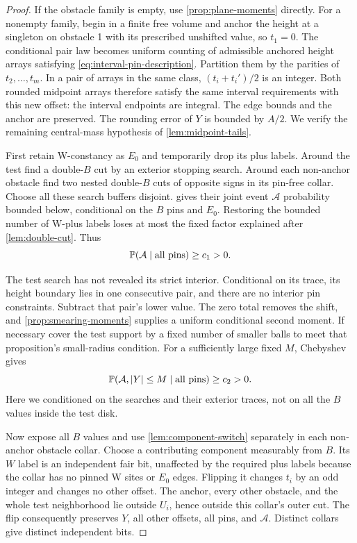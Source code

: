 \begin{proof}
If the obstacle family is empty, use \cref{prop:plane-moments} directly.
For a nonempty family, begin in a finite free volume and anchor the
height at a singleton on obstacle 1 with its prescribed unshifted
value, so $t_1=0$.  The conditional
pair law becomes uniform counting of admissible anchored height arrays
satisfying \eqref{eq:interval-pin-description}.  Partition them by the
parities of $t_2,\ldots,t_m$.  In a pair of arrays in the same class,
$(t_i+t_i')/2$ is an integer.  Both rounded midpoint arrays therefore
satisfy the same interval requirements with this new offset: the interval
endpoints are integral.  The edge bounds and the anchor are preserved.
The rounding error of $Y$ is bounded by $A/2$.  We verify the remaining
central-mass hypothesis of \cref{lem:midpoint-tails}.

First retain W-constancy as $E_0$ and temporarily drop its plus labels.
Around the test find a double-$B$ cut by an exterior stopping search.
Around each non-anchor obstacle find two nested double-$B$ cuts of
opposite signs in its pin-free collar.  Choose all these search buffers
disjoint.   gives their joint event $\mathcal A$
probability bounded below, conditional on the $B$ pins and $E_0$.
Restoring the bounded number of W-plus labels loses at most the fixed
factor explained after \cref{lem:double-cut}.  Thus
\begin{equation}\label{eq:obstacle-cut-probability}
 \mathbb P(\mathcal A\mid\hbox{all pins})\geq c_1>0.
\end{equation}

The test search has not revealed its strict interior.  Conditional on
its trace, its height boundary lies in one consecutive pair, and there
are no interior pin constraints.  Subtract that pair's lower value.
The zero total removes the shift, and \cref{prop:smearing-moments} supplies
a uniform conditional second moment.  If necessary cover the test support
by a fixed number of smaller balls to meet that proposition's small-radius
condition.  For a sufficiently large fixed $M$, Chebyshev gives
\begin{equation}\label{eq:obstacle-central-event}
 \mathbb P(\mathcal A,\lvert Y\rvert\leq M\mid\hbox{all pins})\geq c_2>0.
\end{equation}
Here we conditioned on the searches and their exterior traces, not on
all the $B$ values inside the test disk.

Now expose all $B$ values and use \cref{lem:component-switch} separately
in each non-anchor obstacle collar.  Choose a contributing component
measurably from $B$.  Its $W$ label is an independent fair bit, unaffected
by the required plus labels because the collar has no pinned W sites or
$E_0$ edges.  Flipping it changes $t_i$ by an odd integer and changes no
other offset.  The anchor, every other obstacle, and the whole test neighborhood lie
outside $U_i$, hence outside this collar's outer cut.  The flip consequently
preserves $Y$, all other offsets, all pins, and $\mathcal A$.
Distinct collars give distinct independent bits.


\end{proof}
